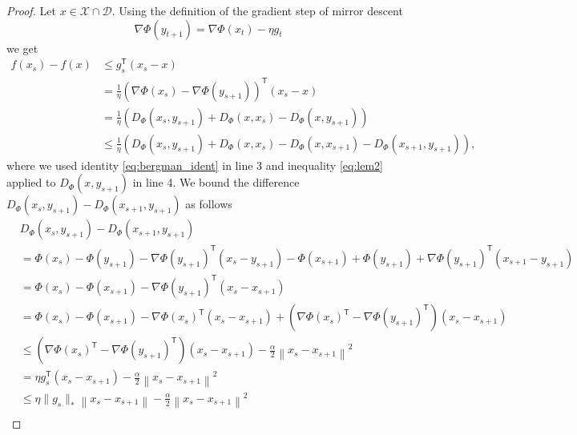 \begin{proof}
Let $x\in \mathcal{X}\cap\mathcal{D}$. Using the definition of the gradient step of mirror descent
\begin{equation*}
	\nabla\Phi(y_{t+1}) = \nabla\Phi(x_t)-\eta g_t
\end{equation*}
we get
\begin{equation}\label{first_part_mirror_descent_lemma}
    \begin{align*}
        f(x_s) - f(x) &\leq g_s^\mathsf{T}\left(x_s - x\right) \\
        & = \frac{1}{\eta}\left(\nabla\Phi(x_s) - \nabla\Phi(y_{s+1}) \right)^\mathsf{T}\left(x_s - x\right) \\
        & = \frac{1}{\eta}\left(D_\Phi(x_s, y_{s+1}) + D_\Phi(x, x_s) - D_\Phi(x, y_{s+1}) \right)	\\
        & \leq  \frac{1}{\eta}\left(D_\Phi(x_s, y_{s+1}) + D_\Phi(x, x_s) - D_\Phi(x, x_{s+1}) - D_\Phi(x_{s+1}, y_{s+1})\right),
    \end{align*}
\end{equation}
where we used identity \eqref{eq:bergman_ident} in line 3 and inequality \eqref{eq:lem2} applied to $D_\Phi(x, y_{s+1})$ in line 4. We bound the difference $D_\Phi(x_s, y_{s+1}) - D_\Phi(x_{s+1}, y_{s+1})$ as follows
\begin{equation}\label{key_inequality_mirror_descent}
    \begin{align*}
	& D_\Phi(x_s, y_{s+1}) - D_\Phi(x_{s+1}, y_{s+1}) 	\\
	& = \Phi(x_s) - \Phi(y_{s+1}) - \nabla \Phi(y_{s+1})^\mathsf{T}(x_s - y_{s+1}) - \Phi(x_{s+1}) + \Phi(y_{s+1}) + \nabla \Phi(y_{s+1})^\mathsf{T}(x_{s+1} - y_{s+1}) \\
	& = \Phi(x_s) - \Phi(x_{s+1}) - \nabla\Phi(y_{s+1})^\mathsf{T}\left(x_s - x_{s+1}\right) \\
	& = \Phi(x_s) - \Phi(x_{s+1}) - \nabla\Phi(x_s)^\mathsf{T}\left(x_s - x_{s+1}\right) + \left(\nabla\Phi(x_s)^\mathsf{T} - \nabla\Phi(y_{s+1})^\mathsf{T}\right)\left(x_s - x_{s+1}\right) \\
	& \leq \left(\nabla\Phi(x_s)^\mathsf{T} - \nabla\Phi(y_{s+1})^\mathsf{T}\right)\left(x_s - x_{s+1}\right) - \frac{\alpha}{2}\left\|x_s - x_{s+1} \right\|^2 \\
	& = \eta g_s^\mathsf{T}\left(x_s - x_{s+1}\right) - \frac{\alpha}{2}\left\|x_s - x_{s+1} \right\|^2 \\
	& \leq \eta \|g_s\|_\ast\left\|x_s - x_{s+1}\right\| -\frac{\alpha}{2}\left\|x_s - x_{s+1}\right\|^2 \\

\end{align*}
\end{equation}
\end{proof}
